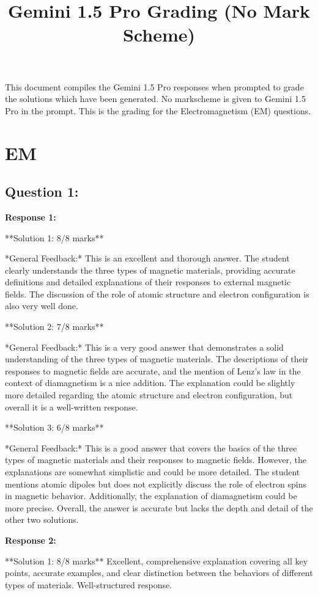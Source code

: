 \documentclass[a4paper,11pt]{article}
\title{Gemini 1.5 Pro Grading (No Mark Scheme)}
\begin{document}
\maketitle
This document compiles the Gemini 1.5 Pro responses when prompted to grade the solutions which have been generated. No markscheme is given to Gemini 1.5 Pro in the prompt. This is the grading for the Electromagnetism (EM) questions. 

\section{EM}
\subsection*{Question 1:}

\textbf{Response 1:}

**Solution 1: 8/8 marks**

*General Feedback:* This is an excellent and thorough answer. The student clearly understands the three types of magnetic materials, providing accurate definitions and detailed explanations of their responses to external magnetic fields. The discussion of the role of atomic structure and electron configuration is also very well done.

**Solution 2: 7/8 marks**

*General Feedback:* This is a very good answer that demonstrates a solid understanding of the three types of magnetic materials. The descriptions of their responses to magnetic fields are accurate, and the mention of Lenz's law in the context of diamagnetism is a nice addition. The explanation could be slightly more detailed regarding the atomic structure and electron configuration, but overall it is a well-written response.

**Solution 3: 6/8 marks**

*General Feedback:* This is a good answer that covers the basics of the three types of magnetic materials and their responses to magnetic fields. However, the explanations are somewhat simplistic and could be more detailed. The student mentions atomic dipoles but does not explicitly discuss the role of electron spins in magnetic behavior. Additionally, the explanation of diamagnetism could be more precise. Overall, the answer is accurate but lacks the depth and detail of the other two solutions.

\bigskip    
\textbf{Response 2:}

**Solution 1: 8/8 marks**
Excellent, comprehensive explanation covering all key points, accurate examples, and clear distinction between the behaviors of different types of materials. Well-structured response.
\end{document}
